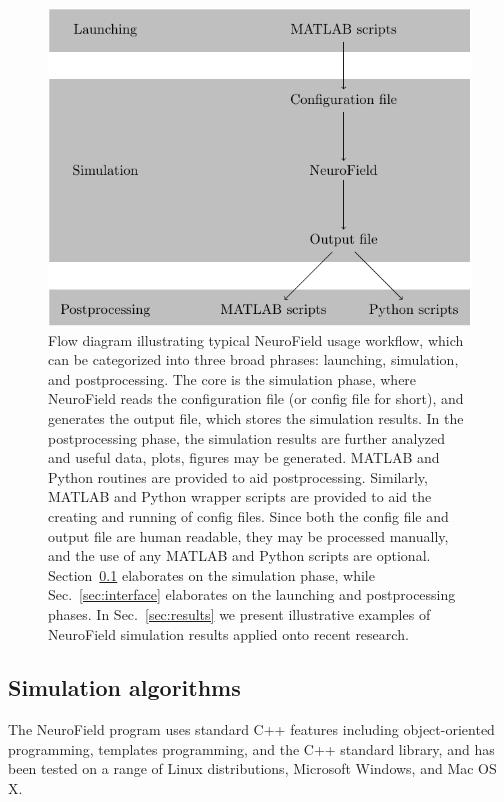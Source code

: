 \documentclass[preprint,review,10pt,authoryear,letterpaper]{elsarticle}
\begin{document}
\begin{figure}[th]
\begin{center}
\includegraphics[scale=.8]{flow.pdf}
\caption{Flow diagram illustrating typical NeuroField usage workflow, which can be categorized into three broad phrases: launching, simulation, and postprocessing. The core is the simulation phase, where NeuroField reads the configuration file (or config file for short), and generates the output file, which stores the simulation results. In the postprocessing phase, the simulation results are further analyzed and useful data, plots, figures may be generated. MATLAB and Python routines are provided to aid postprocessing. Similarly, MATLAB and Python wrapper scripts are provided to aid the creating and running of config files. Since both the config file and output file are human readable, they may be processed manually, and the use of any MATLAB and Python scripts are optional. Section~\ref{sec:neurofield} elaborates on the simulation phase, while Sec.~\ref{sec:interface} elaborates on the launching and postprocessing phases. In Sec.~\ref{sec:results} we present illustrative examples of NeuroField simulation results applied onto recent research.}
\label{fig:workflow}
\end{center}
\end{figure}

\subsection{Simulation algorithms}
\label{sec:neurofield}

The NeuroField program uses standard C++ features including object-oriented programming, templates programming, and the C++ standard library, and has been tested on a range of Linux distributions, Microsoft Windows, and Mac OS X.
\end{document}
